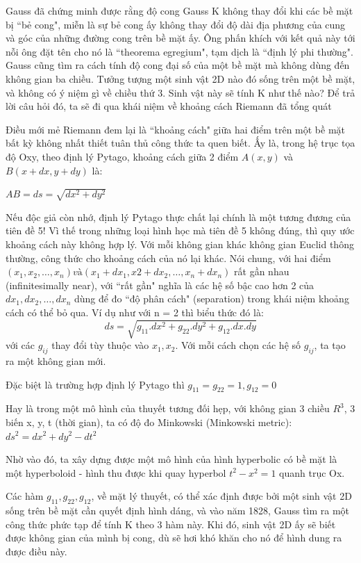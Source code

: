 \begin{multicols}{2}
	Gauss đã chứng minh được rằng độ cong Gauss K không thay đổi khi các bề mặt bị ``bẻ cong", miễn là sự bẻ cong ấy không thay đổi độ dài địa phương của cung và góc của những đường cong trên bề mặt ấy. 
	Ông phấn khích với kết quả này tới nỗi ông đặt tên cho nó là ``theorema egregium", tạm dịch là ``định lý phi thường". Gauss cũng tìm ra cách tính độ cong đại số của một bề mặt mà không dùng đến không gian ba chiều. Tưởng tượng một sinh vật 2D nào đó sống trên một bề mặt, và không có ý niệm gì về chiều thứ 3. Sinh vật này sẽ tính K như thế nào? Để trả lời câu hỏi đó, ta sẽ đi qua khái niệm về khoảng cách Riemann đã tổng quát
	
	Điều mới mẻ Riemann đem lại là ``khoảng cách" giữa hai điểm trên một bề mặt bất kỳ không nhất thiết tuân thủ công thức ta quen biết. Ấy là, trong hệ trục tọa độ Oxy, theo định lý Pytago, khoảng cách giữa 2 điểm $A(x, y)$ và $B(x + dx, y + dy)$ là:
	
	$AB = ds = \sqrt{dx ^2 + dy^2}$ 
	
	Nếu độc giả còn nhớ, định lý Pytago thực chất lại chính là một tương đương của tiên đề 5! Vì thế trong những loại hình học mà tiên đề 5 không đúng, thì quy ước khoảng cách này không hợp lý. Với mỗi không gian khác không gian Euclid thông thường, công thức cho khoảng cách của nó lại khác. Nói chung, với hai điểm $(x_1, x_2, …, x_n) và (x_1 + dx_1, x2 + dx_2, …, x_n + dx_n)$ rất gần nhau (infinitesimally near), với ``rất gần" nghĩa là các hệ số bậc cao hơn 2 của $dx_1, dx_2, …, dx_n$ dùng để đo ``độ phân cách" (separation) trong khái niệm khoảng cách có thể bỏ qua. Ví dụ như với n = 2 thì biểu thức đó là:
	\[ ds = \sqrt{g_{11}.dx ^2 + g_{22}. dy ^2 + g_{12}. dx.dy} \]
	với các $g_{ij}$ thay đổi tùy thuộc vào $x_1, x_2$. Với mỗi cách chọn các hệ số $g_{ij}$, ta tạo ra một không gian mới. 
	
	Đặc biệt là trường hợp định lý Pytago thì  $g_{11} = g_{22} = 1, g_{12} = 0$
	
	Hay là trong một mô hình của thuyết tương đối hẹp, với không gian 3 chiều $R^3$, 3 biến x, y, t (thời gian), ta có độ đo Minkowski (Minkowski metric): $ds^2 = dx ^2 + dy^2 - dt ^2$
	
	Nhờ vào đó, ta xây dựng được một mô hình của hình hyperbolic có bề mặt là một hyperboloid - hình thu được khi quay hyperbol $t^2 - x^2 = 1$ quanh trục Ox.
	
	Các hàm $g_{11}, g_{22}, g_{12}$, về mặt lý thuyết, có thể xác định được bởi một sinh vật 2D sống trên bề mặt cần quyết định hình dáng, và vào năm 1828, Gauss tìm ra một công thức phức tạp để tính K theo 3 hàm này. Khi đó, sinh vật 2D ấy sẽ biết được không gian của mình bị cong, dù sẽ hơi khó khăn cho nó để hình dung ra được điều này.
	

\end{multicols}
